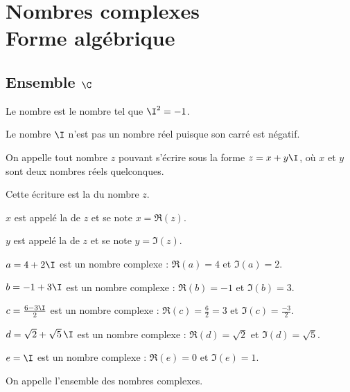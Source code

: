 \documentclass[10pt,openright,twoside,french]{book}
\begin{document}
\chapter[Nombres complexes : forme algébrique]{Nombres complexes\\ Forme algébrique}\label{complexe_algebrique}

\section{Ensemble $\C$}

\begin{Defi}
    Le nombre \iptb{$\I$} est le nombre tel que $\I^2 = -1$.
\end{Defi}

\begin{Rmq}
    Le nombre $\I$ n'est pas un nombre réel puisque son carré est négatif.
\end{Rmq}

\begin{Defi}
    On appelle  tout nombre $z$ pouvant s'écrire sous la forme $z = x + y\I$, où $x$ et $y$ sont deux nombres réels quelconques.\par
    Cette écriture est la  du nombre $z$.\par
    $x$ est appelé la  de $z$ et se note $x = \Re(z)$.\par
    $y$ est appelé la  de $z$ et se note $y = \Im(z)$.\par
\end{Defi}

\begin{Exemple}[s]
    $a = 4 + 2\I$ est un nombre complexe : $\Re(a) = 4$ et $\Im(a) = 2$.\par\medskip
    $b = -1 + 3\I$ est un nombre complexe : $\Re(b) = -1$ et $\Im(b) = 3$.\par\medskip
    $c = \frac{6 - 3\I}{2}$ est un nombre complexe : $\Re(c) = \frac 6 2 = 3$ et $\Im(c) = \frac{-3}{2}$.\par\medskip
    $d = \sqrt 2 + \sqrt 5 \,\I$ est un nombre complexe : $\Re(d) = \sqrt 2$ et $\Im(d) = \sqrt 5$.\par\medskip
    $e = \I$ est un nombre complexe : $\Re(e) = 0$ et $\Im(e) = 1$.
\end{Exemple}

\begin{Defi}
    On appelle \iptb{$\C$} l'ensemble des nombres complexes.
\end{Defi}
\end{document}
